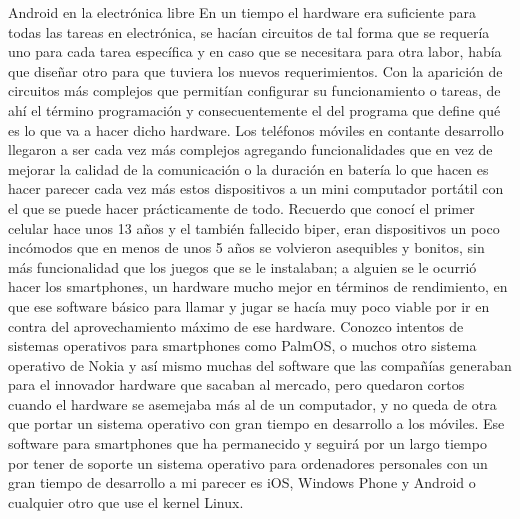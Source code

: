 \begin{multicols}{2}



\vspace{2mm}

Android en la electrónica libre
En un tiempo el hardware era suficiente para todas las tareas en electrónica, se hacían circuitos de tal forma que se requería uno para cada tarea específica y en caso que se necesitara para otra labor, había que diseñar otro para que tuviera los nuevos requerimientos. Con la aparición de circuitos más complejos que permitían configurar su funcionamiento o tareas, de ahí el término programación y consecuentemente el del programa que define qué es lo que va a hacer dicho hardware.
Los teléfonos móviles en contante desarrollo llegaron a ser cada vez más complejos agregando funcionalidades que en vez de mejorar la calidad de la comunicación o la duración en batería lo que hacen es hacer parecer cada vez más estos dispositivos a un mini computador portátil con el que se puede hacer prácticamente de todo.
Recuerdo que conocí el primer celular hace unos 13 años y el también fallecido biper, eran dispositivos un poco incómodos que en menos de unos 5 años se volvieron asequibles y bonitos, sin más funcionalidad que los juegos que se le instalaban; a alguien se le ocurrió hacer los smartphones, un hardware mucho mejor en términos de rendimiento, en que ese software básico para llamar y jugar se hacía muy poco viable por ir en contra del aprovechamiento máximo de ese hardware.
Conozco intentos de sistemas operativos para smartphones como PalmOS, o muchos otro sistema operativo de Nokia y así mismo muchas del software que las compañías generaban para el innovador hardware que sacaban al mercado, pero quedaron cortos cuando el hardware se asemejaba más al de un computador, y no queda de otra que portar un sistema operativo con gran tiempo en desarrollo a los móviles. Ese software para smartphones que ha permanecido y seguirá por un largo tiempo por tener de soporte un sistema operativo para ordenadores personales con un gran tiempo de desarrollo a mi parecer es iOS, Windows Phone y Android o cualquier otro que use el kernel Linux.

\end{multicols}
